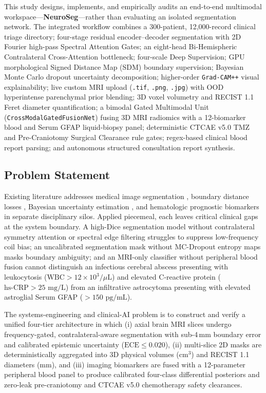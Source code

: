 \documentclass[journal,onecolumn,10pt]{IEEEtran}
\begin{document}
This study designs, implements, and empirically audits an end-to-end multimodal workspace---\textbf{NeuroSeg}---rather than evaluating an isolated segmentation network. The integrated workflow combines a 300-patient, 12,000-record clinical triage directory; four-stage residual encoder--decoder segmentation with 2D Fourier high-pass Spectral Attention Gates; an eight-head Bi-Hemispheric Contralateral Cross-Attention bottleneck; four-scale Deep Supervision; GPU morphological Signed Distance Map (SDM) boundary supervision; Bayesian Monte Carlo dropout uncertainty decomposition; higher-order \texttt{Grad-CAM++} visual explainability; live custom MRI upload (\texttt{.tif}, \texttt{.png}, \texttt{.jpg}) with OOD hyperintense parenchymal prior blending; 3D voxel volumetry and RECIST 1.1 Feret diameter quantification; a bimodal Gated Multimodal Unit (\texttt{CrossModalGatedFusionNet}) fusing 3D MRI radiomics with a 12-biomarker blood and Serum GFAP liquid-biopsy panel; deterministic CTCAE v5.0 TMZ and Pre-Craniotomy Surgical Clearance rule gates; regex-based clinical blood report parsing; and autonomous structured consultation report synthesis.

\subsection{Problem Statement}
Existing literature addresses medical image segmentation \cite{oktay2018attention, isensee2021nnunet, chen2021transunet}, boundary distance losses \cite{kervadec2021boundary}, Bayesian uncertainty estimation \cite{kendall2017uncertainties, gal2016dropout}, and hematologic prognostic biomarkers \cite{bambury2013nlr, perez2021gfap} in separate disciplinary silos. Applied piecemeal, each leaves critical clinical gaps at the system boundary. A high-Dice segmentation model without contralateral symmetry attention or spectral edge filtering struggles to suppress low-frequency coil bias; an uncalibrated segmentation mask without MC-Dropout entropy maps masks boundary ambiguity; and an MRI-only classifier without peripheral blood fusion cannot distinguish an infectious cerebral abscess presenting with leukocytosis ($\text{WBC} > 12 \times 10^3/\mu\text{L}$) and elevated C-reactive protein ($\text{hs-CRP} > 25\text{ mg/L}$) from an infiltrative astrocytoma presenting with elevated astroglial Serum GFAP ($> 150\text{ pg/mL}$).

The systems-engineering and clinical-AI problem is to construct and verify a unified four-tier architecture in which (i) axial brain MRI slices undergo frequency-gated, contralateral-aware segmentation with sub-4\,mm boundary error and calibrated epistemic uncertainty ($\text{ECE} \le 0.020$), (ii) multi-slice 2D masks are deterministically aggregated into 3D physical volumes ($\text{cm}^3$) and RECIST 1.1 diameters ($\text{mm}$), and (iii) imaging biomarkers are fused with a 12-parameter peripheral blood panel to produce calibrated four-class differential posteriors and zero-leak pre-craniotomy and CTCAE v5.0 chemotherapy safety clearances.
\end{document}

